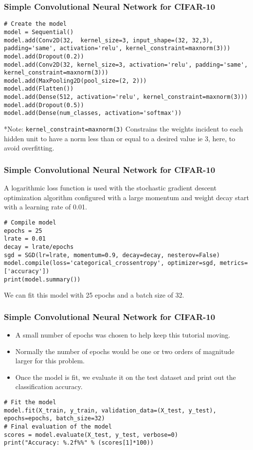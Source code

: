 \begin{frame}[fragile] \frametitle{Simple Convolutional Neural Network for CIFAR-10}
\begin{lstlisting}
# Create the model
model = Sequential()
model.add(Conv2D(32,  kernel_size=3, input_shape=(32, 32,3), padding='same', activation='relu', kernel_constraint=maxnorm(3)))
model.add(Dropout(0.2))
model.add(Conv2D(32, kernel_size=3, activation='relu', padding='same', kernel_constraint=maxnorm(3)))
model.add(MaxPooling2D(pool_size=(2, 2)))
model.add(Flatten())
model.add(Dense(512, activation='relu', kernel_constraint=maxnorm(3)))
model.add(Dropout(0.5))
model.add(Dense(num_classes, activation='softmax'))
\end{lstlisting}

*Note: \lstinline|kernel_constraint=maxnorm(3)| Constrains the weights incident to each hidden unit to have a norm less than or equal to a desired value ie 3, here, to avoid overfitting.
\end{frame}

\begin{frame}[fragile] \frametitle{Simple Convolutional Neural Network for CIFAR-10}
A logarithmic loss function is used with the stochastic gradient descent optimization algorithm configured with a large momentum and weight decay start with a learning rate of 0.01.
\begin{lstlisting}
# Compile model
epochs = 25
lrate = 0.01
decay = lrate/epochs
sgd = SGD(lr=lrate, momentum=0.9, decay=decay, nesterov=False)
model.compile(loss='categorical_crossentropy', optimizer=sgd, metrics=['accuracy'])
print(model.summary())
\end{lstlisting}
We can fit this model with 25 epochs and a batch size of 32.
\end{frame}

\begin{frame}[fragile] \frametitle{Simple Convolutional Neural Network for CIFAR-10}

\begin{itemize}
\item A small number of epochs was chosen to help keep this tutorial moving. 
\item Normally the number of epochs would be one or two orders of magnitude larger for this problem.
\item Once the model is fit, we evaluate it on the test dataset and print out the classification accuracy.
\end{itemize}
\begin{lstlisting}
# Fit the model
model.fit(X_train, y_train, validation_data=(X_test, y_test), epochs=epochs, batch_size=32)
# Final evaluation of the model
scores = model.evaluate(X_test, y_test, verbose=0)
print("Accuracy: %.2f%%" % (scores[1]*100))
\end{lstlisting}
\end{frame}

